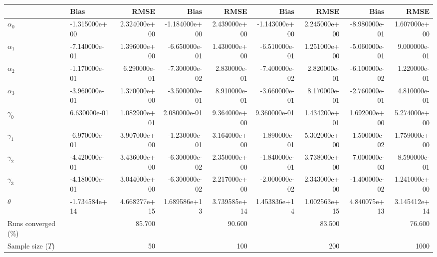 
\begin{tabular}[t]{llrrrrrrr}
\toprule
  & Bias & RMSE & Bias & RMSE & Bias & RMSE & Bias & RMSE\\
\midrule
$\alpha_{0}$ & -1.315000e+00 & 2.324000e+00 & -1.184000e+00 & 2.439000e+00 & -1.143000e+00 & 2.245000e+00 & -8.980000e-01 & 1.607000e+00\\
$\alpha_{1}$ & -7.140000e-01 & 1.396000e+00 & -6.650000e-01 & 1.430000e+00 & -6.510000e-01 & 1.251000e+00 & -5.060000e-01 & 9.000000e-01\\
$\alpha_{2}$ & -1.170000e-01 & 6.290000e-01 & -7.300000e-02 & 2.830000e-01 & -7.400000e-02 & 2.820000e-01 & -6.100000e-02 & 1.220000e-01\\
$\alpha_{3}$ & -3.960000e-01 & 1.370000e+00 & -3.500000e-01 & 8.910000e-01 & -3.660000e-01 & 8.170000e-01 & -2.760000e-01 & 4.810000e-01\\
$\gamma_{0}$ & 6.630000e-01 & 1.082900e+01 & 2.080000e-01 & 9.364000e+00 & 9.360000e-01 & 1.434200e+01 & 1.692000e+00 & 5.274000e+00\\
$\gamma_{1}$ & -6.970000e-01 & 3.907000e+00 & -1.230000e-01 & 3.164000e+00 & -1.890000e-01 & 5.302000e+00 & 1.500000e-02 & 1.759000e+00\\
$\gamma_{2}$ & -4.420000e-01 & 3.436000e+00 & -6.300000e-02 & 2.350000e+00 & -1.840000e-01 & 3.738000e+00 & 7.000000e-03 & 8.590000e-01\\
$\gamma_{3}$ & -4.180000e-01 & 3.044000e+00 & -6.300000e-02 & 2.217000e+00 & -2.000000e-02 & 2.343000e+00 & -1.400000e-02 & 1.241000e+00\\
$\theta$ & -1.734584e+14 & 4.668277e+15 & 1.689586e+13 & 3.739585e+14 & 1.453836e+14 & 1.002563e+15 & 4.840075e+13 & 3.145412e+14\\
Runs converged (\%) &  & 85.700 &  & 90.600 &  & 83.500 &  & 76.600\\
Sample size ($T$) &  & 50 &  & 100 &  & 200 &  & 1000\\
\bottomrule
\end{tabular}
